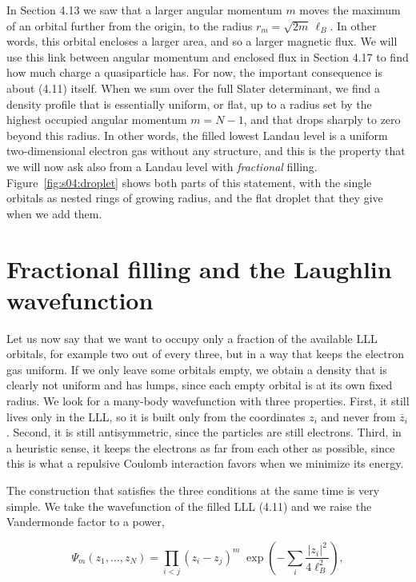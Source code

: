 In Section 4.13 we saw that a larger angular momentum $m$ moves the maximum of an orbital further
from the origin, to the radius $r_m=\sqrt{2m}\,\ell_B$. In other words, this orbital encloses a
larger area, and so a larger magnetic flux. We will use this link between angular momentum and
enclosed flux in Section 4.17 to find how much charge a quasiparticle has. For now, the important
consequence is about (4.11) itself. When we sum over the full Slater determinant, we find a density
profile that is essentially uniform, or flat, up to a radius set by the highest occupied angular
momentum $m=N-1$, and that drops sharply to zero beyond this radius. In other words, the filled
lowest Landau level is a uniform two-dimensional electron gas without any structure, and this is the
property that we will now ask also from a Landau level with \emph{fractional} filling.
Figure~\ref{fig:s04:droplet} shows both parts of this statement, with the single orbitals as
nested rings of growing radius, and the flat droplet that they give when we add them.



\section{Fractional filling and the Laughlin wavefunction}

Let us now say that we want to occupy only a fraction of the available LLL orbitals, for example
two out of every three, but in a way that keeps the electron gas uniform. If we only leave some
orbitals empty, we obtain a density that is clearly not uniform and has lumps, since each empty
orbital is at its own fixed radius. We look for a many-body wavefunction with three properties.
First, it still lives only in the LLL, so it is built only from the coordinates $z_i$ and never
from $\bar z_i$. Second, it is still antisymmetric, since the particles are still electrons.
Third, in a heuristic sense, it keeps the electrons as far from each other as possible, since this
is what a repulsive Coulomb interaction favors when we minimize its energy.

The construction that satisfies the three conditions at the same time is very simple. We take the
wavefunction of the filled LLL (4.11) and we raise the Vandermonde factor to a power,

\begin{equation}
\Psi_m(z_1,\dots,z_N) = \prod_{i<j}(z_i-z_j)^m\; \exp\!\left(-\sum_i \frac{|z_i|^2}{4\ell_B^2}\right),
\end{equation}

